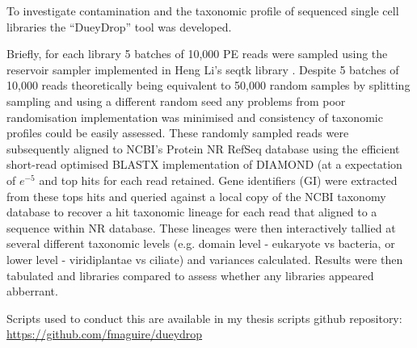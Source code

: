 To investigate contamination and the taxonomic profile of sequenced single cell libraries 
the ``DueyDrop'' tool was developed.  

Briefly, for each library 5 batches of 10,000 PE reads were sampled 
using the reservoir sampler \citep{Vitter1985} implemented in Heng Li's seqtk library \citep{SeqtkGitHub}.
Despite 5 batches of 10,000 reads theoretically being equivalent to 50,000 random samples by splitting
sampling and using a different random seed any problems from poor randomisation implementation 
was minimised and consistency of taxonomic profiles could be easily assessed.
These randomly sampled reads were subsequently aligned to NCBI's Protein NR RefSeq database \citep{Pruitt2007}
using the efficient short-read optimised BLASTX implementation of DIAMOND \citep{Buchfink2015} (at a expectation
    of \(e^{-5}\) and top hits for each read retained.  Gene identifiers (GI) were extracted from these tops hits and queried against a
local copy of the NCBI taxonomy database \citep{Federhen2012} to recover a hit taxonomic lineage for each
read that aligned to a sequence within NR database. These lineages were then interactively tallied 
at several different taxonomic levels (e.g. domain level - eukaryote vs bacteria, or lower level - viridiplantae vs ciliate) and variances
calculated.  Results were then tabulated and libraries compared to assess whether any libraries appeared
abberrant.

Scripts used to conduct this are available in my thesis scripts github repository:
\url{https://github.com/fmaguire/dueydrop}

